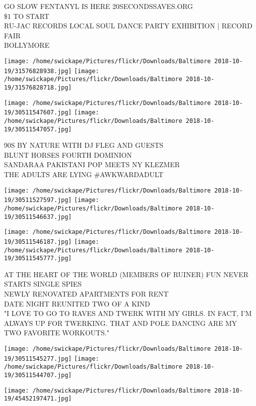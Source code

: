 \documentclass[10pt,letterpaper]{article}
\begin{document}
GO SLOW FENTANYL IS HERE 20SECONDSSAVES.ORG\\
\$1 TO START\\
RU{-}JAC RECORDS LOCAL SOUL DANCE PARTY EXHIBITION | RECORD FAIR\\
BOLLYMORE\\
\pagebreak

\texttt{[image: /home/swickape/Pictures/flickr/Downloads/Baltimore 2018-10-19/31576828938.jpg]}
\texttt{[image: /home/swickape/Pictures/flickr/Downloads/Baltimore 2018-10-19/31576828718.jpg]}

\texttt{[image: /home/swickape/Pictures/flickr/Downloads/Baltimore 2018-10-19/30511547607.jpg]}
\texttt{[image: /home/swickape/Pictures/flickr/Downloads/Baltimore 2018-10-19/30511547057.jpg]}

90S BY NATURE WITH DJ FLEG AND GUESTS\\
BLUNT HORSES FOURTH DOMINION\\
SANDARAA PAKISTANI POP MEETS NY KLEZMER\\
THE ADULTS ARE LYING \#AWKWARDADULT\\
\pagebreak

\texttt{[image: /home/swickape/Pictures/flickr/Downloads/Baltimore 2018-10-19/30511527597.jpg]}
\texttt{[image: /home/swickape/Pictures/flickr/Downloads/Baltimore 2018-10-19/30511546637.jpg]}

\texttt{[image: /home/swickape/Pictures/flickr/Downloads/Baltimore 2018-10-19/30511546187.jpg]}
\texttt{[image: /home/swickape/Pictures/flickr/Downloads/Baltimore 2018-10-19/30511545777.jpg]}

AT THE HEART OF THE WORLD (MEMBERS OF RUINER) FUN NEVER STARTS SINGLE SPIES\\
NEWLY RENOVATED APARTMENTS FOR RENT\\
DATE NIGHT REUNITED TWO OF A KIND\\
"I LOVE TO GO TO RAVES AND TWERK WITH MY GIRLS.  IN FACT, I'M ALWAYS UP FOR TWERKING.  THAT AND POLE DANCING ARE MY TWO FAVORITE WORKOUTS."\\
\pagebreak

\texttt{[image: /home/swickape/Pictures/flickr/Downloads/Baltimore 2018-10-19/30511545277.jpg]}
\texttt{[image: /home/swickape/Pictures/flickr/Downloads/Baltimore 2018-10-19/30511544707.jpg]}

\vspace{0.25in}
\texttt{[image: /home/swickape/Pictures/flickr/Downloads/Baltimore 2018-10-19/45452197471.jpg]}
\end{document}
